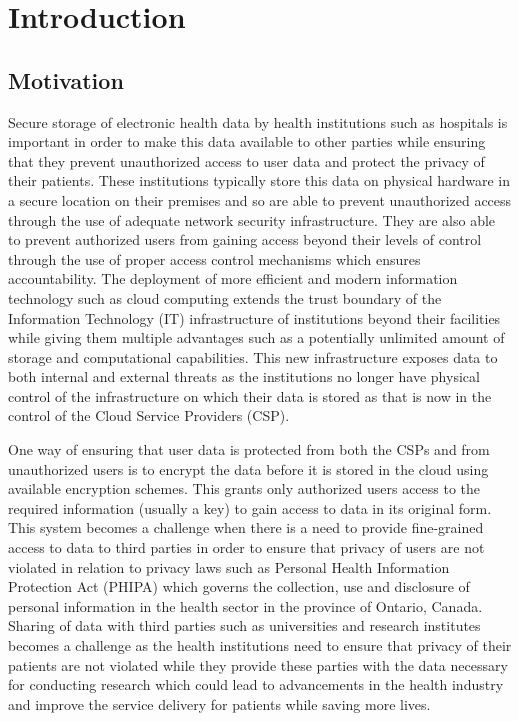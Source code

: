 \chapter{Introduction}
\label{chap:introduction}


\section{Motivation}

Secure storage of electronic health data by health institutions such as hospitals is important in order to make this data available to other parties while ensuring that they prevent unauthorized access to user data and protect the privacy of their patients. These institutions typically store this data on physical hardware in a secure location on their premises and so are able to prevent unauthorized access through the use of adequate network security infrastructure. They are also able to prevent authorized users from gaining access beyond their levels of control through the use of proper access control mechanisms which ensures accountability. The deployment of more efficient and modern information technology such as cloud computing extends the trust boundary of the Information Technology (IT) infrastructure of institutions beyond their facilities while giving them multiple advantages such as a potentially unlimited amount of storage and computational capabilities. This new infrastructure exposes data to both internal and external threats as the institutions no longer have physical control of the infrastructure on which their data is stored as that is now in the control of the Cloud Service Providers (CSP).

One way of ensuring that user data is protected from both the CSPs and from unauthorized users is to encrypt the data before it is stored in the cloud using available encryption schemes. This grants only authorized users access to the required information (usually a key) to gain access to data in its original form. This system becomes a challenge when there is a need to provide fine-grained access to data to third parties in order to ensure that privacy of users are not violated in relation to privacy laws such as Personal Health Information Protection Act (PHIPA) \cite{pihipa} which governs the collection, use and disclosure of personal information in the health sector in the province of Ontario, Canada. Sharing of data with third parties such as universities and research institutes becomes a challenge as the health institutions need to ensure that privacy of their patients are not violated while they provide these parties with the data necessary for conducting research which could lead to advancements in the health industry and improve the service delivery for patients while saving more lives.


